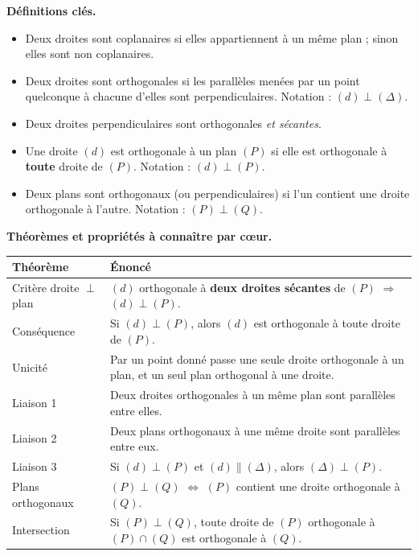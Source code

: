 \documentclass[11pt]{article}
\newcommand{\cle}[1]{{\popxbold\color{popdark}#1}}
\begin{document}
\begin{bilan}
\textbf{Définitions clés.}
\begin{itemize}
  \item Deux droites sont \cle{coplanaires} si elles appartiennent à un même plan ; sinon elles sont \cle{non coplanaires}.
  \item Deux droites sont \cle{orthogonales} si les parallèles menées par un point quelconque à chacune d'elles sont perpendiculaires. Notation : $(d) \perp (\Delta)$.
  \item Deux droites \cle{perpendiculaires} sont orthogonales \emph{et sécantes}.
  \item Une droite $(d)$ est \cle{orthogonale à un plan} $(P)$ si elle est orthogonale à \textbf{toute} droite de $(P)$. Notation : $(d) \perp (P)$.
  \item Deux plans sont \cle{orthogonaux} (ou perpendiculaires) si l'un contient une droite orthogonale à l'autre. Notation : $(P) \perp (Q)$.
\end{itemize}

\textbf{Théorèmes et propriétés à connaître par c\oe ur.}
\begin{center}
\begin{tabularx}{\linewidth}{|l|X|}
\hline
\rowcolor{popblueL} \textbf{Théorème} & \textbf{Énoncé} \\
\hline
Critère droite $\perp$ plan & $(d)$ orthogonale à \textbf{deux droites sécantes} de $(P)$ $\Rightarrow$ $(d) \perp (P)$. \\
\hline
Conséquence & Si $(d) \perp (P)$, alors $(d)$ est orthogonale à toute droite de $(P)$. \\
\hline
Unicité & Par un point donné passe une seule droite orthogonale à un plan, et un seul plan orthogonal à une droite. \\
\hline
Liaison 1 & Deux droites orthogonales à un même plan sont parallèles entre elles. \\
\hline
Liaison 2 & Deux plans orthogonaux à une même droite sont parallèles entre eux. \\
\hline
Liaison 3 & Si $(d) \perp (P)$ et $(d) \parallel (\Delta)$, alors $(\Delta) \perp (P)$. \\
\hline
Plans orthogonaux & $(P) \perp (Q)$ $\iff$ $(P)$ contient une droite orthogonale à $(Q)$. \\
\hline
Intersection & Si $(P) \perp (Q)$, toute droite de $(P)$ orthogonale à $(P)\cap(Q)$ est orthogonale à $(Q)$. \\
\hline
\end{tabularx}
\end{center}


\end{bilan}
\end{document}
